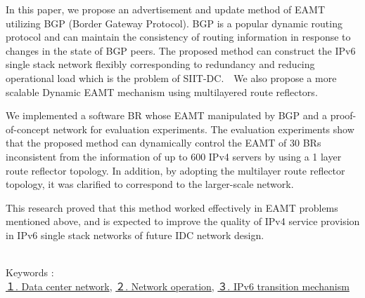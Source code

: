 In this paper, we propose an advertisement and update method of EAMT utilizing BGP (Border Gateway Protocol). BGP is a popular dynamic routing protocol and can maintain the consistency of routing information in response to changes in the state of BGP peers.
The proposed method can construct the IPv6 single stack network flexibly corresponding to redundancy and reducing operational load which is the problem of SIIT-DC.　We also propose a more scalable Dynamic EAMT mechanism using multilayered route reflectors.

We implemented a software BR whose EAMT manipulated by BGP and a proof-of-concept network for evaluation experiments. 
The evaluation experiments show that the proposed method can dynamically control the EAMT of 30 BRs inconsistent from the information of up to 600 IPv4 servers by using a 1 layer route reflector topology. In addition, by adopting the multilayer route reflector topology, it was clarified to correspond to the larger-scale network.

This research proved that this method worked effectively in EAMT problems mentioned above, and is expected to improve the quality of IPv4 service provision in IPv6 single stack networks of future IDC network design.

~\\ 

Keywords : \\
\underline{１. Data center network},
\underline{２. Network operation},
\underline{３. IPv6 transition mechanism}
\begin{flushright}
\edept \\
\eauthor
\end{flushright}

